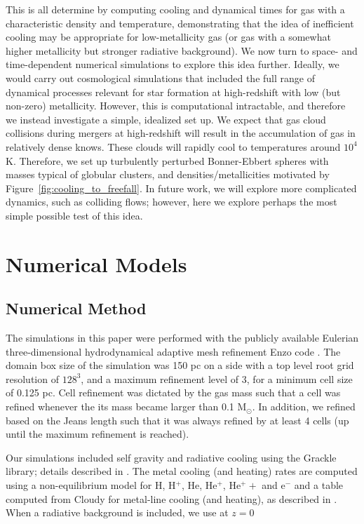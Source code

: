 \documentclass[useAMS,usenatbib]{mn2e}
\begin{document}
This is all determine by computing cooling and dynamical times for gas with a characteristic density and temperature, demonstrating that the idea of inefficient cooling may be appropriate for low-metallicity gas (or gas with a somewhat higher metallicity but stronger radiative background).   We now turn to space- and time-dependent numerical simulations to explore this idea further.  Ideally, we would carry out cosmological simulations that included the full range of dynamical processes relevant for star formation at high-redshift with low (but non-zero) metallicity.  However, this is computational intractable, and therefore we instead investigate a simple, idealized set up.  We expect that gas cloud collisions during mergers at high-redshift will result in the accumulation of gas in relatively dense knows.  These clouds will rapidly cool to temperatures around $10^4$ K.  Therefore, we set up turbulently perturbed Bonner-Ebbert spheres with masses typical of globular clusters, and densities/metallicities motivated by Figure~\ref{fig:cooling_to_freefall}.   In future work, we will explore more complicated dynamics, such as colliding flows; however, here we explore perhaps the most simple possible test of this idea.


%
\section{Numerical Models}
\label{sec:numerical}
\subsection{Numerical Method}

The simulations in this paper were performed with the publicly available Eulerian three-dimensional
hydrodynamical adaptive mesh refinement Enzo code \citep{Bryan2014}. The domain
box size of the simulation was 150 pc on a side with a top level root grid resolution of $128^3$, and
a maximum refinement level of 3, for a minimum cell size of 0.125 pc.  Cell refinement was dictated 
by the gas mass such that a cell was refined whenever the its mass became larger than 0.1 M$_\odot$.
In addition, we refined based on the Jeans length such that it was always refined by at least 4 cells (up until
the maximum refinement is reached).

Our simulations included self gravity and radiative cooling using the
Grackle library; details described in \cite{Bryan2014}. The metal cooling (and
heating) rates are computed using a non-equilibrium model for H, H$^+$, He, He$^+$, He$^++$ and e$^-$
and a table computed from Cloudy for metal-line cooling (and heating), as described in \citet{Smith2016}.
When a radiative background is included, we use \cite{Haardt2012} at $z=$0
\end{document}

